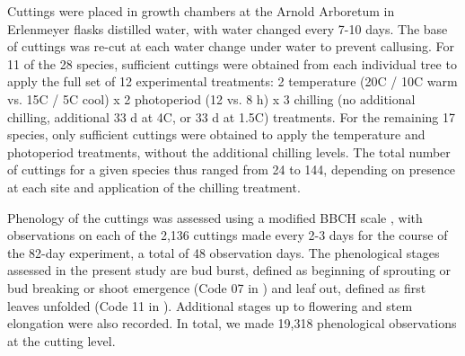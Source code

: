 \documentclass[11pt]{article}
\begin{document}
Cuttings were placed in growth chambers at the Arnold Arboretum in Erlenmeyer flasks distilled water, with water changed every 7-10 days. The base of cuttings was re-cut at each water change under water to prevent callusing. For 11 of the 28 species, sufficient cuttings were obtained from each individual tree to apply the full set of 12 experimental treatments: 2 temperature (20\degree C / 10\degree C warm vs. 15\degree C / 5\degree C cool) x 2 photoperiod (12 vs. 8 h) x 3 chilling (no additional chilling,  additional 33 d at 4\degree C, or 33 d at 1.5\degree C) treatments. For the remaining 17 species, only sufficient cuttings were obtained to apply the temperature and photoperiod treatments, without the additional chilling levels. The total number of cuttings for a given species thus ranged from 24 to 144, depending on presence at each site and application of the chilling treatment.

Phenology of the cuttings was assessed using a modified BBCH scale \cite{Finn:2007}, with observations on each of the 2,136 cuttings made every 2-3 days for the course of the 82-day experiment, a total of 48 observation days. The phenological stages assessed in the present study are bud burst, defined as beginning of sprouting or bud breaking or shoot emergence (Code 07 in \cite{Finn:2007}) and leaf out, defined as first leaves unfolded (Code 11 in \cite{Finn:2007}). Additional stages up to flowering and stem elongation were also recorded. In total, we made 19,318 phenological observations at the cutting level.
%
\end{document}

